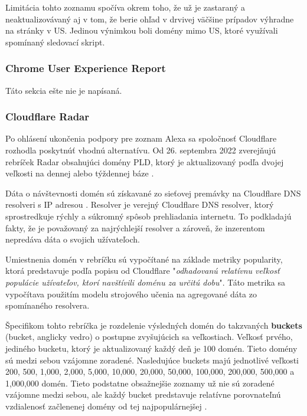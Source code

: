 Limitácia tohto zoznamu spočíva okrem toho, že už je zastaraný a neaktualizovávaný aj v tom, že berie ohľad v drvivej väčšine prípadov výhradne na stránky v US.
Jedinou výnimkou boli domény mimo US, ktoré využívali spomínaný sledovací skript. 

\subsubsection{Chrome User Experience Report}

Táto sekcia ešte nie je napísaná.

\subsubsection{Cloudflare Radar}

Po ohlásení ukončenia podpory pre zoznam Alexa sa spoločnosť Cloudflare rozhodla poskytnúť vhodnú alternatívu.
Od 26. septembra 2022 zverejňujú rebríček Radar obsahujúci domény PLD, ktorý je aktualizovaný podľa dvojej veľkosti na dennej alebo týždennej báze \cite{tranco-methodology}.

Dáta o návštevnosti domén sú získavané zo sieťovej premávky na Cloudflare DNS resolveri s IP adresou .
Resolver  je verejný Cloudflare DNS resolver, ktorý sprostredkuje rýchly a súkromný spôsob prehliadania internetu.
To podkladajú fakty, že je považovaný za najrýchlejší resolver a zároveň, že inzerentom nepredáva dáta o svojich užívateľoch.

Umiestnenia domén v rebríčku sú vypočítané na základe metriky popularity, ktorá predstavuje podľa popisu od Cloudflare "\textit{odhadovanú relatívnu veľkosť populácie užívateľov, ktorí navštívili doménu za určitú dobu}". 
Táto metrika sa vypočítava použitím modelu strojového učenia na agregované dáta zo spomínaného resolvera. 

\pagebreak

Špecifikom tohto rebríčka je rozdelenie výsledných domén do takzvaných \textbf{buckets} (bucket, anglicky vedro) o postupne zvyšujúcich sa veľkostiach.
Veľkosť prvého, jediného bucketu, ktorý je aktualizovaný každý deň je 100 domén. Tieto domény sú medzi sebou vzájomne zoradené.
Nasledujúce buckets majú jednotlivé veľkosti 200, 500, 1,000, 2,000, 5,000, 10,000, 20,000, 50,000, 100,000, 200,000, 500,000 a 1,000,000 domén.
Tieto podstatne obsažnejšie zoznamy už nie sú zoradené vzájomne medzi sebou, ale každý bucket predstavuje relatívne porovnateľnú vzdialenosť začlenenej domény od tej najpopulárnejšej \cite{cloudflare-radar}.


